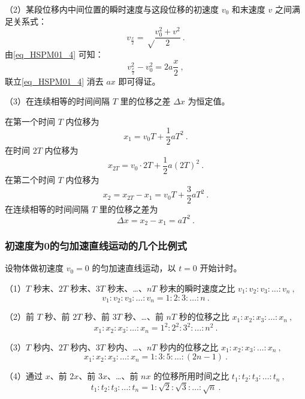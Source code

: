 （2）某段位移内中间位置的瞬时速度与这段位移的初速度 $v_0$ 和末速度 $v$ 之间满足关系式：
\begin{equation}
v_\frac x2=\sqrt \frac{v_0^2+v^2}2~.
\end{equation}
由\autoref{eq_HSPM01_4} 可知：
\begin{equation}
v_{\frac x2}^2-v_0^2=2a\frac x2~,
\end{equation}
联立\autoref{eq_HSPM01_4} 消去 $ax$ 即可得证。

（3）在连续相等的时间间隔 $T$ 里的位移之差 $\Delta x$ 为恒定值。

在第一个时间 $T$ 内位移为
\begin{equation}
x_1=v_0T+\frac12aT^2~.
\end{equation}
在时间 $2T$ 内位移为
\begin{equation}
x_{2T}=v_0\cdot2T+\frac12a(2T)^2~.
\end{equation}
在第二个时间 $T$ 内位移为
\begin{equation}
x_2=x_{2T}-x_1=v_0T+\frac32aT^2~.
\end{equation}
在连续相等的时间间隔 $T$ 里的位移之差为
\begin{equation}
\Delta x=x_2-x_1=aT^2~.
\end{equation}

\subsubsection{初速度为0的匀加速直线运动的几个比例式}
设物体做初速度 $v_0=0$ 的匀加速直线运动，以 $t=0$ 开始计时。

（1）$T$ 秒末、$2T$ 秒末、$3T$ 秒末、…、$nT$ 秒末的瞬时速度之比 $v_1:v_2:v_3:\dots:v_n~,$
\begin{equation}
v_1:v_2:v_3:\dots:v_n=1:2:3:\dots:n~.
\end{equation}

（2）前 $T$ 秒、前 $2T$ 秒、前 $3T$ 秒、…、前 $nT$ 秒的位移之比 $x_1:x_2:x_3:\dots:x_n~,$
\begin{equation}
x_1:x_2:x_3:\dots:x_n=1^2:2^2:3^2:\dots:n^2~.
\end{equation}

（3）$T$ 秒内、$2T$ 秒内、$3T$ 秒内、…、$nT$ 秒内的位移之比 $x_1:x_2:x_3:\dots:x_n~,$
\begin{equation}
x_1:x_2:x_3:\dots:x_n=1:3:5:\dots:(2n-1)~.
\end{equation}

（4）通过 $x$、前 $2x$、前 $3x$、…、前 $nx$ 的位移所用时间之比 $t_1:t_2:t_3:\dots:t_n~,$
\begin{equation}
t_1:t_2:t_3:\dots:t_n=1:\sqrt{2}:\sqrt{3}:\dots:\sqrt{n}~.
\end{equation}

